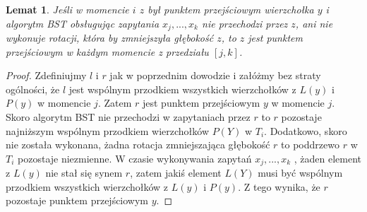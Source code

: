 \documentclass[declaration,shortabstract]{iithesis}
\newcounter{thm}[section]
\theoremstyle{thm}
\theoremstyle{remark}
\theoremstyle{plain}
\theoremstyle{plain}
\theoremstyle{plain}
\newtheorem{lemma}[thm]{Lemat}
\begin{document}
\begin{lemma} 
Jeśli w momencie $i$ $z$ był punktem przejściowym wierzchołka $y$ i algorytm BST obsługując zapytania $x_j, ..., x_k$  nie przechodzi przez $z$, ani nie wykonuje rotacji, która by zmniejszyła głębokość $z$, to $z$ jest punktem przejściowym w każdym momencie z przedziału \([j, k]\). 
\end{lemma}
\begin{proof} Zdefiniujmy $l$ i $r$ jak w poprzednim dowodzie i załóżmy bez straty ogólności, że $l$ jest wspólnym przodkiem wszystkich wierzchołków z $L(y)$ i $P(y)$ w momencie $j$. Zatem $r$ jest punktem przejściowym $y$ w momencie $j$. Skoro algorytm BST nie przechodzi w zapytaniach przez $r$ to $r$ pozostaje najniższym wspólnym przodkiem wierzchołków $P(Y)$ w $T_i$. Dodatkowo, skoro nie została wykonana, żadna rotacja zmniejszająca  głębokość $r$ to poddrzewo $r$ w \(T_i\) pozostaje niezmienne. W czasie wykonywania zapytań \( x_j,..., x_k\) , żaden element z $L(y)$ nie stał się synem $r$, zatem jakiś element $L(Y)$ musi być wspólnym przodkiem wszystkich wierzchołków z $L(y)$ i $P(y)$. Z tego wynika, że $r$ pozostaje punktem przejściowym $y$. 
\end{proof}  
\end{document}
